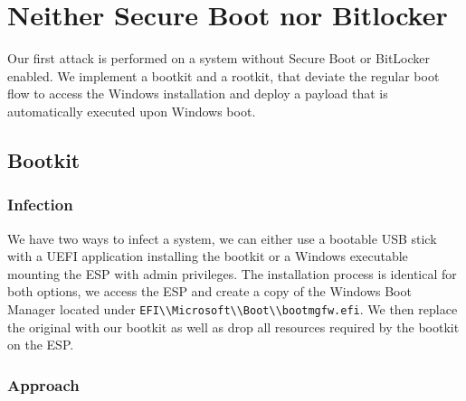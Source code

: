
\section{Neither Secure Boot nor Bitlocker}

Our first attack is performed on a system without Secure Boot or BitLocker enabled.
We implement a bootkit and a rootkit, that deviate the regular boot flow to access the Windows installation and deploy a payload that is automatically executed upon Windows boot.

\subsection{Bootkit}

\subsubsection{Infection}


We have two ways to infect a system, we can either use a bootable USB stick with a UEFI application installing the bootkit or a Windows executable mounting the \ac{ESP} with admin privileges.
The installation process is identical for both options, we access the \ac{ESP} and create a copy of the Windows Boot Manager located under \lstinline{EFI\\Microsoft\\Boot\\bootmgfw.efi}. We then replace the original with our bootkit as well as drop all resources required by the bootkit on the \ac{ESP}.

\subsubsection{Approach}

